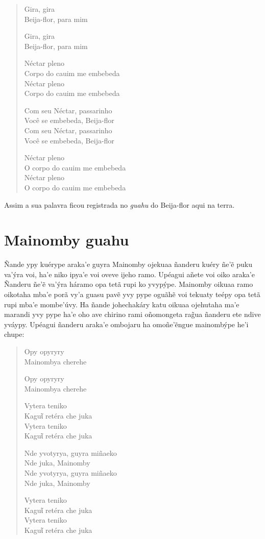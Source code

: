 \begin{verse}
Gira, gira\\
Beija-flor, para mim

Gira, gira\\
Beija-flor, para mim

Néctar pleno\\
Corpo\footnotemark{} do cauim me embebeda\\
Néctar pleno\\
Corpo do cauim me embebeda

Com seu Néctar, passarinho\\
Você se embebeda, Beija-flor\\
Com seu Néctar, passarinho\\
Você se embebeda, Beija-flor

Néctar pleno\\
O corpo do cauim me embebeda\\
Néctar pleno\\
O corpo do cauim me embebeda
\end{verse}


Assim a sua palavra ficou registrada no \emph{guahu} do Beija-flor aqui na terra.

\chapter{Mainomby guahu}

Ñande ypy kuérype araka'e guyra Mainomby ojekuaa ñanderu kuéry ñe'ẽ puku
va'ýra voi, ha'e niko ipya'e voi oveve ijeho ramo. Upéagui añete voi
oiko araka'e Ñanderu ñe'ẽ va'ýra háramo opa tetã rupi ko yvypýpe.
Mainomby oikuaa ramo oikotaha mba'e porã vy'a guasu pavẽ yvy pype oguãhẽ
voi tekuaty teépy opa tetã rupi mba'e mombe'úvy. Ha ñande johechakáry
katu oikuaa ojehutaha ma'e marandi yvy pype ha'e oho ave chirino rami
oñomongeta rag̃ua ñanderu ete ndive yváypy. Upéagui ñanderu araka'e
ombojaru ha omoñe'ẽngue mainombýpe he'i chupe:

\begin{verse}
Opy opyryry\\
Mainombya cherehe

Opy opyryry\\
Mainombya cherehe

Vytera teniko\\
Kaguῖ retéra che juka\footnotemark{}\\
Vytera teniko\\
Kaguῖ retéra che juka

Nde yvotyrya, guyra miñaeko\\
Nde juka, Mainomby\\
Nde yvotyrya, guyra miñaeko\\
Nde juka, Mainomby

Vytera teniko\\
Kaguῖ retéra che juka\\
Vytera teniko\\
Kaguῖ retéra che juka
\end{verse}

